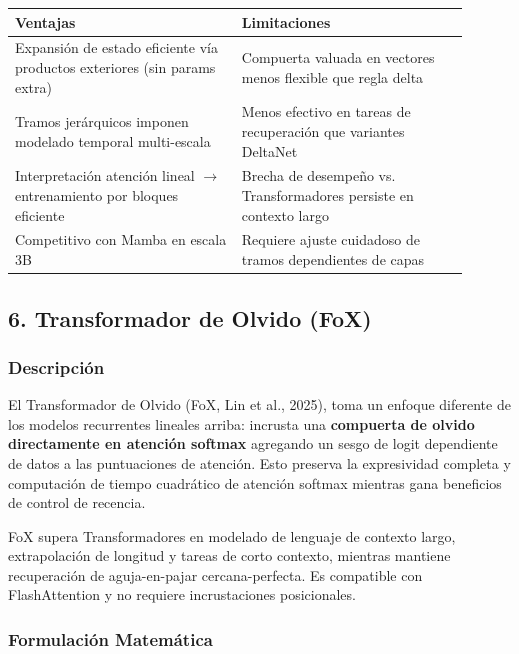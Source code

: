 \documentclass[11pt,a4paper]{article}
\begin{document}
\begin{table}[h]
\centering
\begin{tabular}{|p{0.45\linewidth}|p{0.45\linewidth}|}
\hline
\textbf{Ventajas} & \textbf{Limitaciones} \\
\hline
Expansión de estado eficiente vía productos exteriores (sin params extra) & Compuerta valuada en vectores menos flexible que regla delta \\
\hline
Tramos jerárquicos imponen modelado temporal multi-escala & Menos efectivo en tareas de recuperación que variantes DeltaNet \\
\hline
Interpretación atención lineal $\rightarrow$ entrenamiento por bloques eficiente & Brecha de desempeño vs. Transformadores persiste en contexto largo \\
\hline
Competitivo con Mamba en escala 3B & Requiere ajuste cuidadoso de tramos dependientes de capas \\
\hline
\end{tabular}
\end{table}

\subsection{6. Transformador de Olvido (FoX)}

\subsubsection{Descripción}

El Transformador de Olvido (FoX, Lin et al., 2025), toma un enfoque diferente de los modelos recurrentes lineales arriba: incrusta una \textbf{compuerta de olvido directamente en atención softmax} agregando un sesgo de logit dependiente de datos a las puntuaciones de atención. Esto preserva la expresividad completa y computación de tiempo cuadrático de atención softmax mientras gana beneficios de control de recencia.

FoX supera Transformadores en modelado de lenguaje de contexto largo, extrapolación de longitud y tareas de corto contexto, mientras mantiene recuperación de aguja-en-pajar cercana-perfecta. Es compatible con FlashAttention y no requiere incrustaciones posicionales.

\subsubsection{Formulación Matemática}
\end{document}
